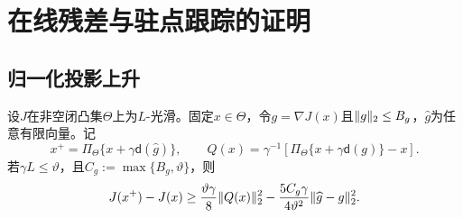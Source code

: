 \section{在线残差与驻点跟踪的证明}\label{app:online}

\subsection{归一化投影上升}

\begin{lemma}[单步归一化投影上升]\label{lem:projected-ascent}
设$J$在非空闭凸集$\Theta$上为$L$-光滑。固定$x\in\Theta$，令$g=\nabla J(x)$且$\lVert g\rVert_2\le B_g$，$\widehat g$为任意有限向量。记
\[
 x^+=\Pi_\Theta\{x+\gamma\mathsf d(\widehat g)\},
 \qquad
 Q(x)=\gamma^{-1}[\Pi_\Theta\{x+\gamma\mathsf d(g)\}-x].
\]
若$\gamma L\le\vartheta$，且$C_g:=\max\{B_g,\vartheta\}$，则
\begin{equation}\label{eq:one-step-ascent}
 J(x^+)-J(x)
 \ge\frac{\vartheta\gamma}{8}\lVert Q(x)\rVert_2^2
 -\frac{5C_g\gamma}{4\vartheta^2}\lVert\widehat g-g\rVert_2^2.
\end{equation}
\end{lemma}

